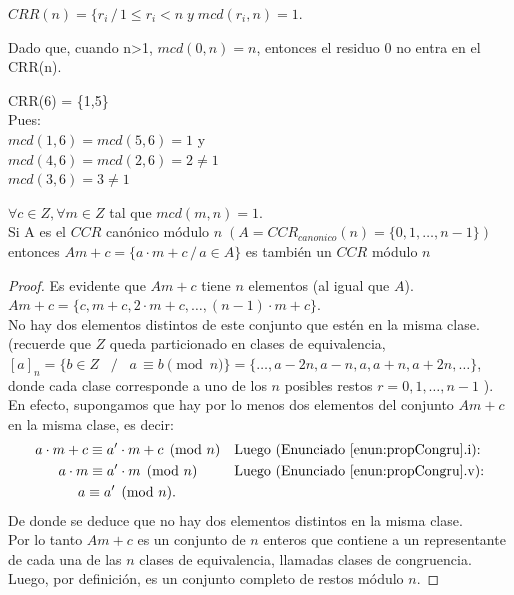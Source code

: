 \begin{definicion}[CRR]\label{def:crr}
$CRR(n) = \{r_i \, / \, 1 \le r_i < n \; y \; mcd(r_i,n) = 1$.
\end{definicion}

Dado que, cuando n>1, $mcd(0,n)=n$, entonces el residuo 0 no entra en el
CRR(n).

\begin{ejemplo}
CRR(6) = \{1,5\} \\
Pues: \\
$mcd(1,6) = mcd(5,6) = 1$ y \\
$mcd(4,6) = mcd(2,6) = 2 \ne  1$ \\
$mcd(3,6) = 3 \ne 1$
\end{ejemplo}

\begin{enunciado} \label{enun:propCCR}\leavevmode\par
$\forall c \in Z, \forall m \in Z$ tal que $mcd(m, n)=1$.\\
Si A es el $CCR$ canónico módulo $n \; (A=CCR_{canonico}(n)=\{0,1,\ldots, n-1\})$ entonces $Am+c=\{a \cdot m+c \, / \, a \in A\}$ es también un $CCR$ módulo $n$
\end{enunciado}

\begin{proof} Es evidente que $Am+c$ tiene $n$ elementos (al igual que $A$). \\
$Am+c=\{c, m+c, 2 \cdot m+c, \ldots,(n-1) \cdot m+c\}$. \\
No hay dos elementos distintos de este conjunto que estén en la misma clase. \\
(recuerde que $Z$ queda particionado en clases de equivalencia,\\
$[a]_{n}=\{b \in Z$ \, $/$ \, $ a \, \equiv b \pmod n\}=\{\ldots, a-2 n, a-n, a, a+n, a+2 n, \ldots\}$, \\
donde cada clase corresponde a uno de los $n$ posibles restos $r=0,1, \ldots, n-1$ ).\\
En efecto, supongamos que hay por lo menos dos elementos del conjunto $Am+c$ en la misma clase, es decir: 
\begin{align*}
&a \cdot m+c  \equiv a' \cdot m+c \pmod n && \text{Luego (Enunciado~\ref{enun:propCongru}.i):} \\
&\;\;\;\;\;\; a \cdot m  \equiv a' \cdot m \pmod n     && \text{Luego (Enunciado~\ref{enun:propCongru}.v):} \\
&\;\;\;\;\;\;\;\;\;\;\; a  \equiv a' \pmod n.
\end{align*}
De donde se deduce que no hay dos elementos distintos en la misma clase. \\
Por lo tanto $Am+c$ es un conjunto de $n$ enteros que contiene a un representante de cada una de las $n$ clases de equivalencia, llamadas clases de congruencia. \\
Luego, por definición, es un conjunto completo de restos módulo $n$.
\end{proof}


